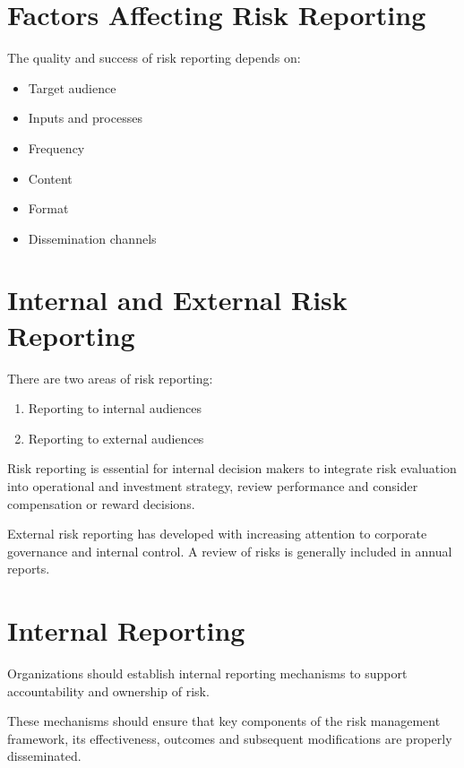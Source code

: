 \documentclass[
]{book}
\providecommand{\tightlist}{%
  \setlength{\itemsep}{0pt}\setlength{\parskip}{0pt}}
\begin{document}
\section{Factors Affecting Risk Reporting}\label{factors-affecting-risk-reporting}

The quality and success of risk reporting depends on:

\begin{itemize}
\tightlist
\item
  Target audience
\item
  Inputs and processes
\item
  Frequency
\item
  Content
\item
  Format
\item
  Dissemination channels
\end{itemize}

\section{Internal and External Risk Reporting}\label{internal-and-external-risk-reporting}

There are two areas of risk reporting:

\begin{enumerate}
\def\labelenumi{\arabic{enumi}.}
\tightlist
\item
  Reporting to internal audiences
\item
  Reporting to external audiences
\end{enumerate}

Risk reporting is essential for internal decision makers to integrate risk evaluation into operational and investment strategy, review performance and consider compensation or reward decisions.

External risk reporting has developed with increasing attention to corporate governance and internal control. A review of risks is generally included in annual reports.

\section{Internal Reporting}\label{internal-reporting}

Organizations should establish internal reporting mechanisms to support accountability and ownership of risk.

These mechanisms should ensure that key components of the risk management framework, its effectiveness, outcomes and subsequent modifications are properly disseminated.
\end{document}
